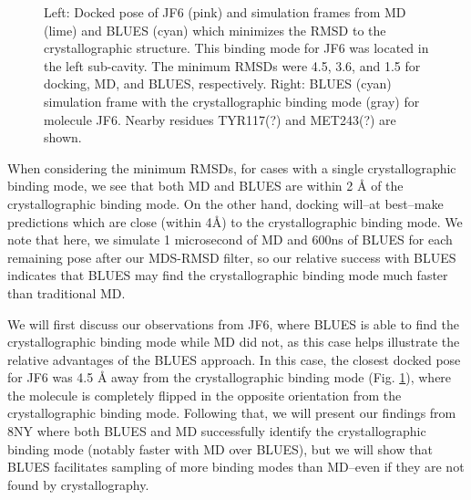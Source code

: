 \begin{figure}[!tbp]
  \centering
  \hfill
  \caption[JF6 docked poses and crystal structure]{Left: Docked pose of JF6 (pink) and simulation frames from MD (lime) and BLUES (cyan) which minimizes the RMSD to the crystallographic structure. This binding mode for JF6 was located in the left sub-cavity. The minimum RMSDs were 4.5, 3.6, and 1.5 for docking, MD, and BLUES, respectively. Right: BLUES (cyan) simulation frame with the crystallographic binding mode (gray) for molecule JF6. Nearby residues TYR117(?) and MET243(?) are shown.}
  \label{fig:JF6-poses}
\end{figure}

When considering the minimum RMSDs, for cases with a single crystallographic binding mode, we see that both MD and BLUES are within 2 {\AA} of the crystallographic binding mode.
On the other hand, docking will--at best--make predictions which are close (within 4{\AA}) to the crystallographic binding mode.
We note that here, we simulate 1 microsecond of MD and 600ns of BLUES for each remaining pose after our MDS-RMSD filter, so our relative success with BLUES indicates that BLUES may find the crystallographic binding mode much faster than traditional MD.

We will first discuss our observations from JF6, where BLUES is able to find the crystallographic binding mode while MD did not, as this case helps illustrate the relative advantages of the BLUES approach.
In this case, the closest docked pose for JF6 was 4.5 {\AA} away from the crystallographic binding mode (Fig. \ref{fig:JF6-poses}), where the molecule is completely flipped in the opposite orientation from the crystallographic binding mode.
Following that, we will present our findings from 8NY where both BLUES and MD successfully identify the crystallographic binding mode (notably faster with MD over BLUES), but we will show that BLUES facilitates sampling of more binding modes than MD--even if they are not found by crystallography.


